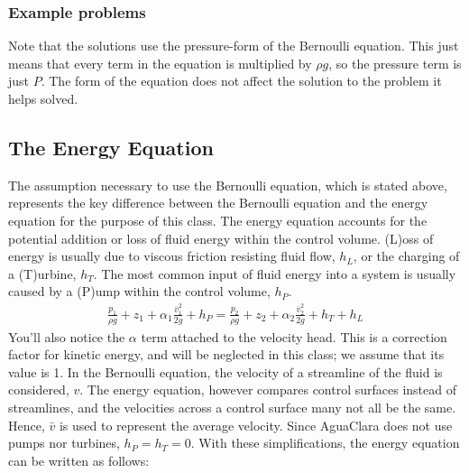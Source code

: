 \documentclass[letterpaper,10pt,english]{sphinxmanual}
\begin{document}
\subsubsection{Example problems}
\label{\detokenize{Review/Review_Fluid_Mechanics:example-problems}}
 Note that the solutions use the pressure-form of the Bernoulli equation. This just means that every term in the equation is multiplied by \(\rho g\), so the pressure term is just \(P\). The form of the equation does not affect the solution to the problem it helps solved.


\subsection{The Energy Equation}
\label{\detokenize{Review/Review_Fluid_Mechanics:the-energy-equation}}\label{\detokenize{Review/Review_Fluid_Mechanics:heading-energy-equation}}
The assumption necessary to use the Bernoulli equation, which is stated above, represents the key difference between the Bernoulli equation and the energy equation for the purpose of this class. The energy equation accounts for the potential addition or loss of fluid energy within the control volume. (L)oss of energy is usually due to viscous friction resisting fluid flow, \(h_L\), or the charging of a (T)urbine, \(h_T\). The most common input of fluid energy into a system is usually caused by a (P)ump within the control volume, \(h_P\).
\begin{equation}\label{equation:Review/Review_Fluid_Mechanics:Review/Review_Fluid_Mechanics:4}
\begin{split}\frac{p_{1}}{\rho g} + z_{1} + \alpha_{1} \frac{\bar v_{1}^2}{2g} + h_P = \frac{p_{2}}{\rho g} + z_{2} + {\alpha_{2}} \frac{\bar v_{2}^2}{2g} + h_T + h_L\end{split}
\end{equation}
You’ll also notice the \(\alpha\) term attached to the velocity head. This is a correction factor for kinetic energy, and will be neglected in this class; we assume that its value is 1. In the Bernoulli equation, the velocity of a streamline of the fluid is considered, \(v\). The energy equation, however compares control surfaces instead of streamlines, and the velocities across a control surface many not all be the same. Hence, \(\bar v\) is used to represent the average velocity. Since AguaClara does not use pumps nor turbines, \(h_P = h_T = 0\). With these simplifications, the energy equation can be written as follows:
\end{document}
